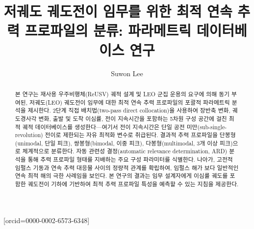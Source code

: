 \documentclass[a4paper,fleqn]{cas-dc}
\begin{document}
\let\WriteBookmarks\relax
\def\floatpagepagefraction{1}
\def\textpagefraction{.001}

\renewcommand{\topfraction}{0.9}
\renewcommand{\bottomfraction}{0.9}
\renewcommand{\dbltopfraction}{0.9}
\renewcommand{\textfraction}{0.1}
\renewcommand{\floatpagefraction}{0.8}
\renewcommand{\dblfloatpagefraction}{0.8}



\title [mode = title]{저궤도 궤도전이 임무를 위한 최적 연속 추력 프로파일의 분류: 파라메트릭 데이터베이스 연구}



\author[1]{Suwon Lee}[orcid=0000-0002-6573-6348]

\cormark[1]





\begin{abstract}
본 연구는 재사용 우주비행체(ReUSV) 궤적 설계 및 LEO 군집 운용의 요구에 의해 동기 부여된, 저궤도(LEO) 궤도전이 임무에 대한 최적 연속 추력 프로파일의 포괄적 파라메트릭 분석을 제시한다. 2단계 직접 배치법(two-pass direct collocation)을 사용하여 장반축 변화, 궤도경사각 변화, 출발 및 도착 이심률, 전이 지속시간을 포함하는 5차원 구성 공간에 걸친 최적 궤적 데이터베이스를 생성한다---여기서 전이 지속시간은 단일 공전 미만(sub-single-revolution) 전이로 제한되는 자유 최적화 변수로 취급된다. 결과적 추력 프로파일을 단봉형(unimodal, 단일 피크), 쌍봉형(bimodal, 이중 피크), 다봉형(multimodal, 3개 이상 피크)으로 체계적으로 분류한다. 자동 관련성 결정(automatic relevance determination, ARD) 분석을 통해 추력 프로파일 형태를 지배하는 주요 구성 파라미터를 식별한다. 나아가, 고전적 임펄스 기동과 연속 추력 대응물 사이의 정량적 관계를 확립하여, 임펄스 해가 보다 일반적인 연속 최적 해의 극한 사례임을 보인다. 본 연구의 결과는 임무 설계자에게 이심률 궤도를 포함한 궤도전이 기하에 기반하여 최적 추력 프로파일 특성을 예측할 수 있는 지침을 제공한다.
\end{abstract}
\end{document}
